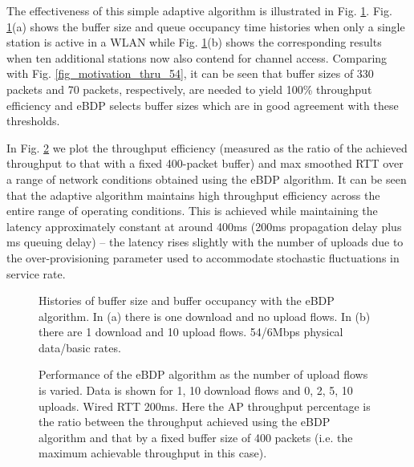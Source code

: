 \documentclass[10pt,twocolumn, journal]{IEEEtran}
\begin{document}
The effectiveness of this simple adaptive algorithm is illustrated in Fig.
\ref{fig_eBDP_histories}.  Fig. \ref{fig_eBDP_histories}(a) shows the buffer size and queue occupancy time histories when only a single station is active in a WLAN while Fig. \ref{fig_eBDP_histories}(b) shows the corresponding results when ten additional stations now also contend for channel access.    Comparing with Fig. \ref{fig_motivation_thru_54}, it can be seen that buffer sizes of 330 packets and 70 packets, respectively, are needed to yield 100\% throughput efficiency and eBDP selects buffer sizes which are in good agreement with these thresholds.

In Fig. \ref{fig_eBDP_varyuls} we plot the throughput efficiency (measured as the ratio of the achieved throughput to that with a fixed 400-packet buffer) and max smoothed RTT over a range of network conditions obtained using the eBDP algorithm.  It can be seen that the adaptive algorithm maintains high throughput efficiency across the entire range of operating conditions. This is achieved while maintaining the latency approximately constant at around 400ms (200ms propagation delay plus ms queuing delay) -- the latency rises slightly with the number of uploads due to the over-provisioning parameter  used to accommodate
stochastic fluctuations in service rate.

\begin{figure}[tb]
   \centering
   \caption{Histories of buffer size and buffer occupancy with the eBDP algorithm.
   In (a) there is one download and no upload flows. In (b) there are 1 download and 10 upload flows. 54/6Mbps physical data/basic rates. }
   \label{fig_eBDP_histories}
\end{figure}


\begin{figure}[tb]
   \centering
   \caption{Performance of the eBDP algorithm as the number of upload
    flows is varied. Data is shown for 1, 10 download flows
   and 0, 2, 5, 10 uploads.  Wired RTT 200ms.  Here the AP throughput percentage is the ratio between the throughput achieved using the eBDP algorithm and that by a fixed buffer size of 400 packets (i.e. the maximum achievable throughput in this case). }
   \label{fig_eBDP_varyuls}
\end{figure}
\end{document}
